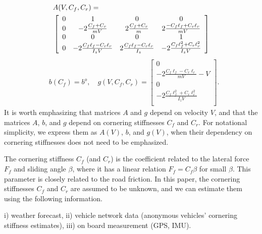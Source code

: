 \documentclass[letterpaper, 10 pt, conference]{ieeeconf}
\begin{document}
\begin{align*}
    &A(V,C_f,C_r)=\nonumber\\
    &\left[
    \begin{array}{cccc}
        0& 1& 0& 0\\
        0& -2\frac{C_f+C_r}{m V}& 2\frac{C_f+C_r}{m}& 2\frac{-C_f\ell_f+C_r\ell_r}{m V}\\
        0& 0& 0& 1\\
        0& -2\frac{C_f\ell_f-C_r\ell_r}{I_z V}& 2\frac{C_f\ell_f-C_r\ell_r}{I_z}& -2\frac{C_f\ell_f^2+C_r\ell_r^2}{I_z V}
    \end{array}
    \right]
    \end{align*}\begin{align*}
    & b(C_f) = b^o, \quad
    g(V,C_f,C_r) =\left[
    \begin{array}{c}
        0\\
        -2\frac{C_f\ell_f - C_r\ell_r}{m V} - V\\
        0\\
        -2\frac{C_f\ell_f^2 + C_r\ell_r^2}{I_z V}\\
    \end{array}
    \right].
\end{align*}
It is worth emphasizing that matrices $A$ and $g$ depend on velocity $V$, and that the matrices $A$, $b$, and $g$ depend on cornering stiffnesses $C_f$ and $C_r$. For notational simplicity, we  express them as $A(V)$, $b$, and $g(V)$, when their dependency on cornering stiffnesses does not need to be emphasized.

The cornering stiffness $C_f$ (and $C_r$) is the coefficient related to the lateral force $F_{f}$ and sliding angle $\beta$, where it has a linear relation $F_f = C_f \beta$ for small $\beta$. This parameter is closely related to the road friction. In this paper, the cornering stiffnesses $C_f$ and $C_r$ are assumed to be unknown, and we can estimate them using the following information.
\begin{information}
i) weather forecast, ii) vehicle network data (anonymous vehicles' cornering stiffness estimates), iii)
on board measurement (GPS, IMU).
\label{infor1}
\end{information}
\end{document}
